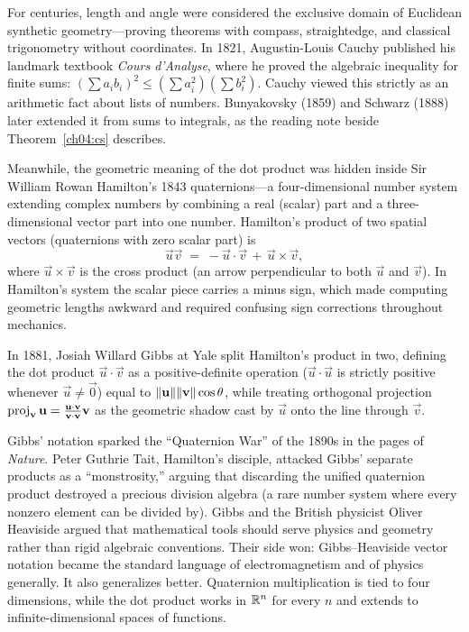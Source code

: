 \begin{historybox}
For centuries, length and angle were
considered the exclusive domain of Euclidean synthetic geometry---proving theorems with compass,
straightedge, and classical trigonometry without coordinates. In 1821, Augustin-Louis Cauchy published
his landmark textbook \emph{Cours d'Analyse}, where he proved the algebraic inequality for finite sums:
$(\sum a_i b_i)^2 \le (\sum a_i^2)(\sum b_i^2)$. Cauchy viewed this strictly as an arithmetic fact
about lists of numbers. Bunyakovsky (1859) and Schwarz (1888) later extended it from sums to
integrals, as the reading note beside Theorem~\ref{ch04:cs} describes.

Meanwhile, the geometric meaning of the dot product was hidden inside Sir William Rowan Hamilton's
1843 quaternions---a four-dimensional number system extending complex numbers by combining a real
(scalar) part and a three-dimensional vector part into one number. Hamilton's product of two spatial
vectors (quaternions with zero scalar part) is
\[
  \vec{u}\vec{v} \;=\; -\vec{u}\cdot\vec{v} \,+\, \vec{u}\times\vec{v},
\]
where $\vec{u}\times\vec{v}$ is the cross product (an arrow perpendicular to both $\vec{u}$ and $\vec{v}$).
In Hamilton's system the scalar piece carries a minus sign, which made
computing geometric lengths awkward and required confusing sign corrections throughout mechanics.

In 1881, Josiah Willard Gibbs at Yale split Hamilton's product
in two, defining the dot product $\vec{u}\cdot\vec{v}$ as a positive-definite operation
($\vec u\cdot\vec u$ is strictly positive whenever $\vec{u}\ne\vec{0}$) equal to $\lVert\mathbf{u}\rVert\lVert\mathbf{v}\rVert\cos\theta$, while treating orthogonal
projection $\operatorname{proj}_{\mathbf{v}}\mathbf{u} = \frac{\mathbf{u}\cdot\mathbf{v}}{\mathbf{v}\cdot\mathbf{v}}\mathbf{v}$ as the
geometric shadow cast by $\vec{u}$ onto the line through $\vec{v}$.

Gibbs' notation sparked the ``Quaternion War'' of the 1890s in the pages of \emph{Nature}. Peter Guthrie Tait, Hamilton's disciple,
attacked Gibbs' separate products as a ``monstrosity,'' arguing that discarding the unified quaternion
product destroyed a precious division algebra (a rare number system where every nonzero element can be
divided by). Gibbs and the British physicist Oliver Heaviside argued that mathematical tools should
serve physics and geometry rather than rigid algebraic conventions. Their side won: Gibbs--Heaviside
vector notation became the standard language of electromagnetism and of physics generally. It also
generalizes better. Quaternion multiplication is tied to four dimensions, while the dot product works
in $\mathbb{R}^n$ for every $n$ and extends to infinite-dimensional spaces of functions.


\end{historybox}
